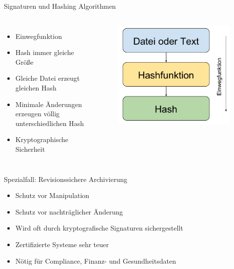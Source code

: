 \documentclass[10pt]{beamer}
\begin{document}
%
%
\begin{frame}[fragile]{Signaturen und Hashing Algorithmen}
\begin{columns}[T,c,onlytextwidth]
	\begin{itemize}
		\item Einwegfunktion
		\item Hash immer gleiche Größe
		\item Gleiche Datei erzeugt gleichen Hash
		\item Minimale Änderungen erzeugen völlig unterschiedlichen Hash
		\item Kryptographische Sicherheit
	\end{itemize}
	\begin{figure}
		\includegraphics[width=1\textwidth]{images/hashing}
	\end{figure}
\end{columns}
\end{frame}

%
%
\begin{frame}[fragile]{Spezialfall: Revisionssichere Archivierung}
	\begin{itemize}
	\item Schutz vor Manipulation
	\item Schutz vor nachträglicher Änderung
	\item Wird oft durch kryptografische Signaturen sichergestellt
	\item Zertifizierte Systeme sehr teuer
	\item Nötig für Compliance, Finanz- und Gesundheitsdaten
\end{itemize}
\end{frame}
\end{document}
